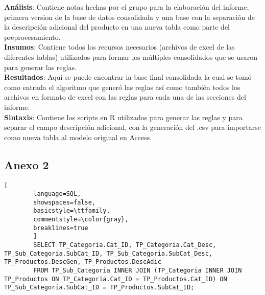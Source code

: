 \documentclass[]{article}
\begin{document}
	\textbf{Análisis}: Contiene notas hechas por el grupo para la elaboración del informe, primera version de la base de datos consolidada y una base con la separación de la descripción adicional del producto en una nueva tabla como parte del preprocesamiento.\\
	
	\textbf{Insumos}: Contiene todos los recursos necesarios (archivos de excel de las diferentes tablas) utilizados para formar los múltiples consolidados que se usaron para generar las reglas.\\
	
	\textbf{Resultados}: Aquí se puede encontrar la base final consolidada la cual se tomó como entrada el algoritmo que generó las reglas así como también todos los  archivos en formato de excel con las reglas para cada una de las secciones del informe.\\
	
	\textbf{Sintaxis}: Contiene los scripts en R utilizados para generar las reglas y para separar el campo descripción adicional, con la generación del .csv para importarse como nueva tabla al modelo original en Access.\\
	
		\subsection*{Anexo 2}
		\label{subsec:Anexo1}
		\begin{lstlisting}[
		language=SQL,
		showspaces=false,
		basicstyle=\ttfamily,
		commentstyle=\color{gray},
		breaklines=true
		]
		SELECT TP_Categoria.Cat_ID, TP_Categoria.Cat_Desc, TP_Sub_Categoria.SubCat_ID, TP_Sub_Categoria.SubCat_Desc, TP_Productos.DescGen, TP_Productos.DescAdic
		FROM TP_Sub_Categoria INNER JOIN (TP_Categoria INNER JOIN TP_Productos ON TP_Categoria.Cat_ID = TP_Productos.Cat_ID) ON TP_Sub_Categoria.SubCat_ID = TP_Productos.SubCat_ID;
		
		\end{lstlisting}
		

	
	

	
\end{document}
